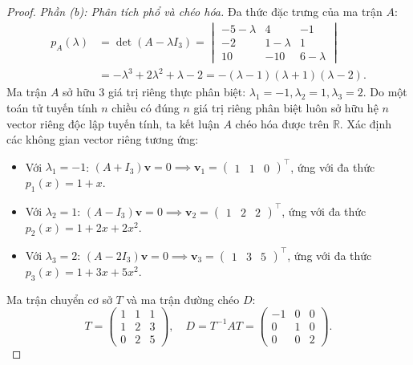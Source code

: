 \documentclass{article}
\begin{document}
\begin{proof}
\emph{Phần (b): Phân tích phổ và chéo hóa.}
Đa thức đặc trưng của ma trận $A$:
\begin{align}
    p_A(\lambda) &= \det(A - \lambda I_3) = \begin{vmatrix}
        -5 - \lambda & 4 & -1 \\
        -2 & 1 - \lambda & 1 \\
        10 & -10 & 6 - \lambda
    \end{vmatrix} \nonumber \\
    &= -\lambda^3 + 2\lambda^2 + \lambda - 2 = -(\lambda - 1)(\lambda + 1)(\lambda - 2).
\end{align}
Ma trận $A$ sở hữu 3 giá trị riêng thực phân biệt: $\lambda_1 = -1, \lambda_2 = 1, \lambda_3 = 2$. Do một toán tử tuyến tính $n$ chiều có đúng $n$ giá trị riêng phân biệt luôn sở hữu hệ $n$ vector riêng độc lập tuyến tính, ta kết luận $A$ chéo hóa được trên $\mathbb{R}$.
Xác định các không gian vector riêng tương ứng:
\begin{itemize}
    \item Với $\lambda_1 = -1$: $(A + I_3)\mathbf{v} = 0 \implies \mathbf{v}_1 = \begin{pmatrix} 1 & 1 & 0 \end{pmatrix}^\top$, ứng với đa thức $p_1(x) = 1 + x$.
    \item Với $\lambda_2 = 1$: $(A - I_3)\mathbf{v} = 0 \implies \mathbf{v}_2 = \begin{pmatrix} 1 & 2 & 2 \end{pmatrix}^\top$, ứng với đa thức $p_2(x) = 1 + 2x + 2x^2$.
    \item Với $\lambda_3 = 2$: $(A - 2I_3)\mathbf{v} = 0 \implies \mathbf{v}_3 = \begin{pmatrix} 1 & 3 & 5 \end{pmatrix}^\top$, ứng với đa thức $p_3(x) = 1 + 3x + 5x^2$.
\end{itemize}
Ma trận chuyển cơ sở $T$ và ma trận đường chéo $D$:
\begin{equation}
    T = \begin{pmatrix}
        1 & 1 & 1 \\
        1 & 2 & 3 \\
        0 & 2 & 5
    \end{pmatrix}, \quad
    D = T^{-1}AT = \begin{pmatrix}
        -1 & 0 & 0 \\
        0 & 1 & 0 \\
        0 & 0 & 2
    \end{pmatrix}.
\end{equation}


\end{proof}
\end{document}
